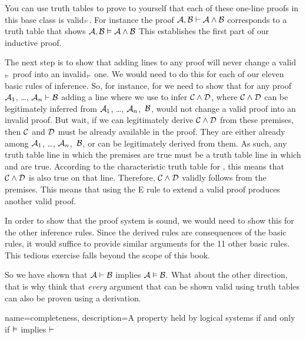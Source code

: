You can use truth tables to prove to yourself that each of these one-line proofs in this base class is valid$_{\vDash}$. For instance the proof $\mathcal{A}, \mathcal{B} \vdash \mathcal{A} \wedge \mathcal{B}$ corresponds to a truth table that shows $\mathcal{A}, \mathcal{B} \vDash  \mathcal{A} \wedge \mathcal{B}$ This establishes the first part of our inductive proof. 

The next step is to show that adding lines to any proof will never change a valid$_{\vDash}$ proof into an invalid$_{\vDash}$ one. We would need to do this for each of our eleven basic rules of inference. So, for instance, for  we need to show that for any proof $\mathcal{A}_{1}$, \dots, $\mathcal{A}_{n} \vdash  \mathcal{B}$ adding a line where we use  to infer $\mathcal{C} \wedge \mathcal{D}$, where $\mathcal{C} \wedge \mathcal{D}$ can be legitimately inferred from $\mathcal{A}_{1}$, \dots, $\mathcal{A}_{n}$,~$\mathcal{B}$, would not change a valid proof into an invalid proof. But wait, if we can legitimately derive $\mathcal{C} \wedge \mathcal{D}$ from these premises, then $\mathcal{C}$ and $\mathcal{D}$ must be already available in the proof. They are either already among $\mathcal{A}_{1}$, \dots, $\mathcal{A}_{n}$,~$\mathcal{B}$, or can be legitimately derived from them. As such, any truth table line in which the premises are true must be a truth table line in which  and  are true. According to the characteristic truth table for \eand, this means that $\mathcal{C} \wedge \mathcal{D}$ is also true on that line. Therefore, $\mathcal{C} \wedge \mathcal{D}$ validly follows from the premises. This means that using the {\eand}E rule to extend a valid proof produces another valid proof.

In order to show that the proof system is sound, we would need to show this for the other inference rules. Since the derived rules are consequences of the basic rules, it would suffice to provide similar arguments for the 11 other basic rules. This tedious exercise falls beyond the scope of this book.

So we have shown that $\mathcal{A} \vdash  \mathcal{B}$ implies $\mathcal{A} \vDash \mathcal{B}.$ What about the other direction, that is why think that \emph{every} argument that can be shown valid using truth tables can also be proven using a derivation. 

{
name=completeness,
description={A property held by logical systems if and only if $\vDash $ implies $\vdash $}
}

